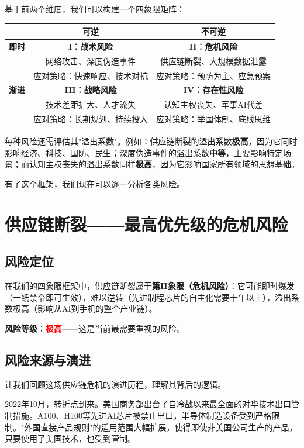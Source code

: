 基于前两个维度，我们可以构建一个四象限矩阵：

\begin{center}
\small
\begin{tabular}{|c|c|c|}
\hline
& \textbf{可逆} & \textbf{不可逆} \\
\hline
\textbf{即时} & \textbf{I：战术风险} & \textbf{II：危机风险} \\
& 网络攻击、深度伪造事件 & 供应链断裂、大规模数据泄露 \\
& 应对策略：快速响应、技术对抗 & 应对策略：预防为主、应急预案 \\
\hline
\textbf{渐进} & \textbf{III：战略风险} & \textbf{IV：存在性风险} \\
& 技术差距扩大、人才流失 & 认知主权丧失、军事AI代差 \\
& 应对策略：长期规划、持续投入 & 应对策略：举国体制、底线思维 \\
\hline
\end{tabular}
\end{center}

每种风险还需评估其"溢出系数"。例如：供应链断裂的溢出系数\textbf{极高}，因为它同时影响经济、科技、国防、民生；深度伪造事件的溢出系数\textbf{中等}，主要影响特定场景；而认知主权丧失的溢出系数同样\textbf{极高}，因为它影响国家所有领域的思想基础。

有了这个框架，我们现在可以逐一分析各类风险。

\section{供应链断裂——最高优先级的危机风险}

\subsection{风险定位}

在我们的四象限框架中，供应链断裂属于\textbf{第II象限（危机风险）}：它可能即时爆发（一纸禁令即可生效），难以逆转（先进制程芯片的自主化需要十年以上），溢出系数极高（影响从AI到手机的整个产业链）。

\textbf{风险等级}：\textcolor{red}{\textbf{极高}}——这是当前最需要重视的风险。

\subsection{风险来源与演进}

让我们回顾这场供应链危机的演进历程，理解其背后的逻辑。

2022年10月，转折点到来。美国商务部出台了自冷战以来最全面的对华技术出口管制措施。A100、H100等先进AI芯片被禁止出口，半导体制造设备受到严格限制。"外国直接产品规则"的适用范围大幅扩展，使得即使非美国公司生产的产品，只要使用了美国技术，也受到管制。

